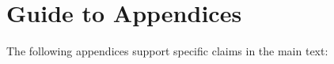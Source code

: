\documentclass[preprint]{article}
\begin{document}
\appendix
{}

\section{Guide to Appendices}
\label{app:guide}

The following appendices support specific claims in the main text:
\end{document}
